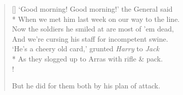 \documentclass[MAIN]{subfiles}
\begin{document}
\settowidth{\versewidth}{Now the soldiers he smiled at are most of 'em dead,}
\begin{verse}[\versewidth]
`Good morning! Good morning!' the General said\\*
When we met him last week on our way to the line.\\
Now the soldiers he smiled at are most of 'em dead,\\
And we're cursing his staff for incompetent swine.\\
`He's a cheery old card,' grunted \emph{Harry} to \emph{Jack}\\*
As they slogged up to {\sc Arras} with rifle \& pack.\\!

But he did for them both by his plan of attack.
\end{verse}
\end{document}
